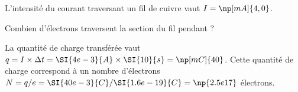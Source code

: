 
\finEntrainement




\titreEntrainementFacultatif	{}%
\hauteurLargeurCadreReponse		{7mm}{2.5cm}
\initialisationEntrainement

\debutEntrainement

L'intensité du courant traversant un fil de cuivre vaut $I=\np[mA]{4,0}$. 

\begin{enonce}
Combien d'électrons traversent la section du fil pendant  ?
\end{enonce}


\begin{corrigeNewpage}
La quantité de charge transférée vaut $q=I\times \Delta t=\SI{4e-3}{A}\times \SI{10}{s}=\np[mC]{40}$. Cette quantité de charge correspond à un nombre d'électrons $N=q/e=\SI{40e-3}{C}/\SI{1.6e-19}{C}=\np{2.5e17}$ électrons.
\end{corrigeNewpage}




